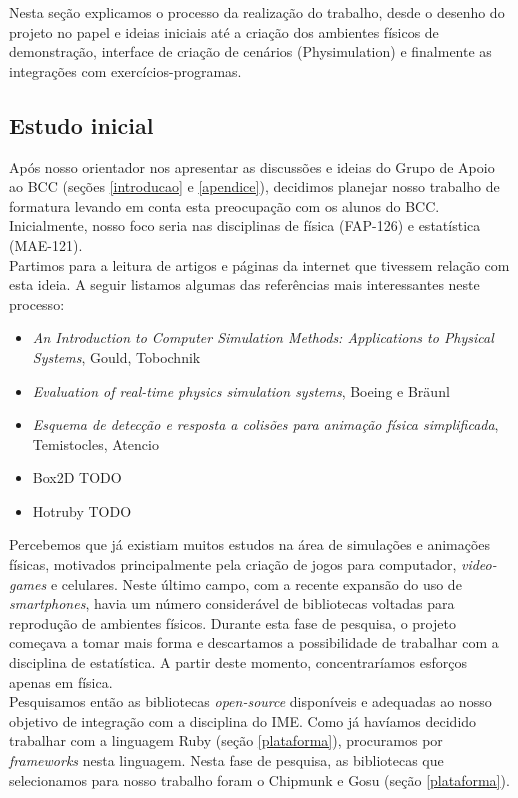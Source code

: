 Nesta seção explicamos o processo da realização do trabalho, desde o desenho do projeto no papel e ideias iniciais até a criação dos ambientes físicos de demonstração, interface de criação de cenários (Physimulation) e finalmente as integrações com exercícios-programas.

\subsection{Estudo inicial}
Após nosso orientador nos apresentar as discussões e ideias do Grupo de Apoio ao BCC (seções \ref{introducao} e \ref{apendice}), decidimos planejar nosso trabalho de formatura levando em conta esta preocupação com os alunos do BCC. Inicialmente, nosso foco seria nas disciplinas de física (FAP-126) e estatística (MAE-121). \\

Partimos para a leitura de artigos e páginas da internet que tivessem relação com esta ideia. A seguir listamos algumas das referências mais interessantes neste processo:
\begin{itemize}
	\item \textit{An Introduction to Computer Simulation Methods: Applications to Physical Systems}, Gould, Tobochnik
	\item \textit{Evaluation of real-time physics simulation systems}, Boeing e Bräunl
	\item \textit{Esquema de detecção e resposta a colisões para animação física simplificada}, Temistocles, Atencio
	\item Box2D TODO
	\item Hotruby TODO
\end{itemize}

Percebemos que já existiam muitos estudos na área de simulações e animações físicas, motivados principalmente pela criação de jogos para computador, \textit{video-games} e celulares. Neste último campo, com a recente expansão do uso de \textit{smartphones}, havia um número considerável de bibliotecas voltadas para reprodução de ambientes físicos. Durante esta fase de pesquisa, o projeto começava a tomar mais forma e descartamos a possibilidade de trabalhar com a disciplina de estatística. A partir deste momento, concentraríamos esforços apenas em física. \\

Pesquisamos então as bibliotecas \textit{open-source} disponíveis e adequadas ao nosso objetivo de integração com a disciplina do IME.
Como já havíamos decidido trabalhar com a linguagem Ruby (seção \ref{plataforma}), procuramos por \textit{frameworks} nesta linguagem. Nesta fase de pesquisa, as bibliotecas que selecionamos para nosso trabalho foram o Chipmunk e Gosu (seção \ref{plataforma}). 

